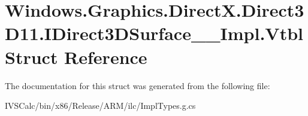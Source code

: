 \hypertarget{struct_windows_1_1_graphics_1_1_direct_x_1_1_direct3_d11_1_1_i_direct3_d_surface_____impl_1_1_vtbl}{}\section{Windows.\+Graphics.\+Direct\+X.\+Direct3\+D11.\+I\+Direct3\+D\+Surface\+\_\+\+\_\+\+Impl.\+Vtbl Struct Reference}
\label{struct_windows_1_1_graphics_1_1_direct_x_1_1_direct3_d11_1_1_i_direct3_d_surface_____impl_1_1_vtbl}


The documentation for this struct was generated from the following file\+:\begin{DoxyCompactItemize}
\item 
I\+V\+S\+Calc/bin/x86/\+Release/\+A\+R\+M/ilc/Impl\+Types.\+g.\+cs\end{DoxyCompactItemize}
